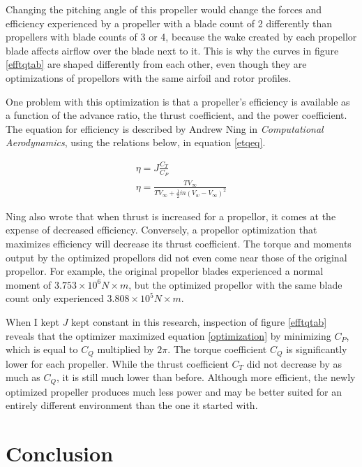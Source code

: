 \documentclass[journal ]{new-aiaa}
\begin{document}
Changing the pitching angle of this propeller would change the forces and efficiency experienced by a propeller with a blade count of 2 differently than propellers with blade counts of 3 or 4, because the wake created by each propellor blade affects airflow over the blade next to it. This is why the curves in figure \ref{efftqtab} are shaped differently from each other, even though they are optimizations of propellors with the same airfoil and rotor profiles.

One problem with this optimization is that a propeller's efficiency is available as a function of the advance ratio, the thrust coefficient, and the power coefficient. The equation for efficiency is described by Andrew Ning in \emph{Computational Aerodynamics},\cite{ComAer} using the relations below, in equation \ref{etqeq}.

\begin{equation}
	\begin{aligned}
	\label{etqeq}
	\eta = J \frac{C_{T}}{C_{P}} \\
	\eta = \frac{T V_{\infty}}{T V_{\infty} + \frac{1}{2} \dot{m} (V_{w} - V_{\infty})^{2}}
	\end{aligned}
\end{equation}

Ning also wrote that when thrust is increased for a propellor, it comes at the expense of decreased efficiency.\cite{ComAer} Conversely, a propellor optimization that maximizes efficiency will decrease its thrust coefficient. The torque and moments output by the optimized propellors did not even come near those of the original propellor. For example, the original propellor blades experienced a normal moment of $3.753 \times 10^{6}N \times m$, but the optimized propellor with the same blade count only experienced $3.808 \times 10^{5} N \times m$.

When I kept $J$ kept constant in this research, inspection of figure \ref{efftqtab} reveals that the optimizer maximized equation \ref{optimization} by minimizing $C_{P}$, which is equal to $C_{Q}$ multiplied by $2 \pi$. The torque coefficient $C_{Q}$ is significantly lower for each propeller. While the thrust coefficient $C_{T}$ did not decrease by as much as $C_{Q}$, it is still much lower than before. Although more efficient, the newly optimized propeller produces much less power and may be better suited for an entirely different environment than the one it started with.


\section{Conclusion}
\end{document}
